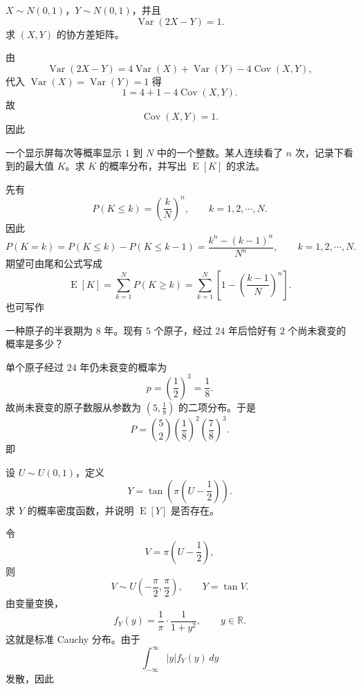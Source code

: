 ﻿

\begin{question}
$X\sim N(0,1)$，$Y\sim N(0,1)$，并且
\[
\operatorname{Var}(2X-Y)=1.
\]
求 $(X,Y)$ 的协方差矩阵。
\begin{solution}
由
\[
\operatorname{Var}(2X-Y)=4\operatorname{Var}(X)+\operatorname{Var}(Y)-4\operatorname{Cov}(X,Y),
\]
代入 $\operatorname{Var}(X)=\operatorname{Var}(Y)=1$ 得
\[
1=4+1-4\operatorname{Cov}(X,Y).
\]
故
\[
\operatorname{Cov}(X,Y)=1.
\]
因此
\end{solution}
\end{question}

\begin{question}
一个显示屏每次等概率显示 $1$ 到 $N$ 中的一个整数。某人连续看了 $n$ 次，记录下看到的最大值 $K$。求 $K$ 的概率分布，并写出 $\operatorname{E}[K]$ 的求法。
\begin{solution}
先有
\[
P(K\le k)=\left(\frac{k}{N}\right)^n,\qquad k=1,2,\cdots,N.
\]
因此
\[
P(K=k)=P(K\le k)-P(K\le k-1)
=\frac{k^n-(k-1)^n}{N^n},\qquad k=1,2,\cdots,N.
\]
期望可由尾和公式写成
\[
\operatorname{E}[K]=\sum_{k=1}^{N}P(K\ge k)
=\sum_{k=1}^{N}\left[1-\left(\frac{k-1}{N}\right)^n\right].
\]
也可写作
\end{solution}
\end{question}

\begin{question}
一种原子的半衰期为 $8$ 年。现有 $5$ 个原子，经过 $24$ 年后恰好有 $2$ 个尚未衰变的概率是多少？
\begin{solution}
单个原子经过 $24$ 年仍未衰变的概率为
\[
p=\left(\frac12\right)^3=\frac18.
\]
故尚未衰变的原子数服从参数为 $(5,\frac18)$ 的二项分布。于是
\[
P=\binom52\left(\frac18\right)^2\left(\frac78\right)^3.
\]
即
\end{solution}
\end{question}

\begin{question}
设 $U\sim U(0,1)$，定义
\[
Y=\tan\!\left(\pi\left(U-\frac12\right)\right).
\]
求 $Y$ 的概率密度函数，并说明 $\operatorname{E}[Y]$ 是否存在。
\begin{solution}
令
\[
V=\pi\left(U-\frac12\right),
\]
则
\[
V\sim U\!\left(-\frac{\pi}{2},\frac{\pi}{2}\right),\qquad Y=\tan V.
\]
由变量变换，
\[
f_Y(y)=\frac{1}{\pi}\cdot \frac{1}{1+y^2},\qquad y\in \mathbb R.
\]
这就是标准 Cauchy 分布。由于
\[
\int_{-\infty}^{\infty}|y|f_Y(y)\,dy
\]
发散，因此
\end{solution}
\end{question}

